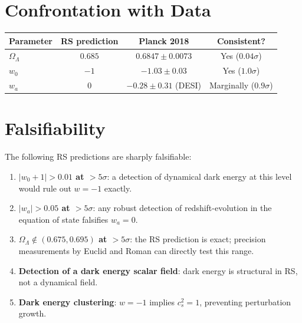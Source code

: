 \documentclass[12pt,a4paper]{article}
\theoremstyle{definition}
\theoremstyle{remark}
\begin{document}
\section{Confrontation with Data}
\label{sec:data}

\begin{center}
\renewcommand{\arraystretch}{1.3}
\begin{tabular}{lccc}
\toprule
\textbf{Parameter} & \textbf{RS prediction} &
\textbf{Planck 2018} & \textbf{Consistent?} \\
\midrule
$\Omega_\Lambda$ & $0.685$ & $0.6847 \pm 0.0073$ & Yes ($0.04\sigma$) \\
$w_0$ & $-1$ & $-1.03 \pm 0.03$ & Yes ($1.0\sigma$) \\
$w_a$ & $0$ & $-0.28 \pm 0.31$ (DESI) & Marginally ($0.9\sigma$) \\
\bottomrule
\end{tabular}
\end{center}

\section{Falsifiability}
\label{sec:falsifiability}

The following RS predictions are sharply falsifiable:
\begin{enumerate}
  \item \textbf{$|w_0 + 1| > 0.01$ at $> 5\sigma$}: a detection of
  dynamical dark energy at this level would rule out $w = -1$ exactly.
  \item \textbf{$|w_a| > 0.05$ at $> 5\sigma$}: any robust detection of
  redshift-evolution in the equation of state falsifies $w_a = 0$.
  \item \textbf{$\Omega_\Lambda \notin (0.675, 0.695)$ at $> 5\sigma$}:
  the RS prediction is exact; precision measurements by Euclid and Roman
  can directly test this range.
  \item \textbf{Detection of a dark energy scalar field}: dark energy is
  structural in RS, not a dynamical field.
  \item \textbf{Dark energy clustering}: $w = -1$ implies $c_s^2 = 1$,
  preventing perturbation growth.
\end{enumerate}
\end{document}
